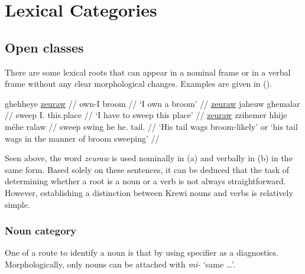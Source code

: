 
\section{Lexical Categories}
\subsection{Open classes}
There are some lexical roots that can appear in a nominal frame or in a verbal frame without any clear morphological changes. Examples are given in (\nextx).

\pex
\a \begingl
\gla ghehheye \underline{zeuraw} //
\glb own-I broom //
\glft `I own a broom' //
\endgl
\a \begingl
\gla \underline{zeuraw} jaheuw ghemalar //
\glb sweep I. this.place //
\glft `I have to sweep this place' //
\endgl
\a \begingl
\gla \underline{zeuraw} zzihemer hhije méhe ralaw //
\glb sweep swing he he. tail. //
\glft `His tail wags broom-likely' or `his tail wags in the manner of broom sweeping' //
\endgl
\xe

\noindent Seen above, the word \emph{zeuraw} is used nominally in (\lastx a) and verbally in (\lastx b) in the same form. Based solely on these sentences, it can be deduced that the task of determining whether a root is a noun or a verb is not always straightforward. However, establishing a distinction between Krewi nouns and verbs is relatively simple.

\subsubsection{Noun category}
One of a route to identify a noun is that by using specifier as a diagnostics. Morphologically, only nouns can be attached with \emph{mi-} `same \ldots'.\todo

\ex {}\xe



